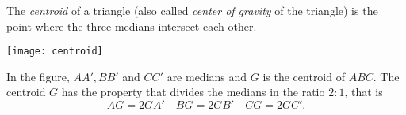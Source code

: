 \documentclass{article}
\begin{document}
The \emph{centroid} of a triangle (also called \emph{center of gravity} of 
the triangle) is the point where the three medians intersect each other.

\begin{center}
\texttt{[image: centroid]}
\end{center}

In the figure, $AA', BB'$ and $CC'$ are medians and $G$ is the centroid of $ABC$.
The centroid $G$ has the property that divides the medians in the ratio $2:1$, that is 
$$AG=2GA'\quad BG=2GB'\quad CG=2GC'.$$
\end{document}
